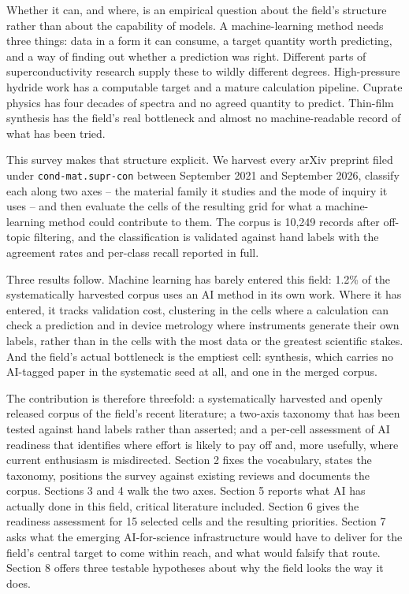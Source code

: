 \documentclass[
  11pt,
]{article}
\begin{document}
Whether it can, and where, is an empirical question about the field's
structure rather than about the capability of models. A machine-learning
method needs three things: data in a form it can consume, a target
quantity worth predicting, and a way of finding out whether a prediction
was right. Different parts of superconductivity research supply these to
wildly different degrees. High-pressure hydride work has a computable
target and a mature calculation pipeline. Cuprate physics has four
decades of spectra and no agreed quantity to predict. Thin-film
synthesis has the field's real bottleneck and almost no machine-readable
record of what has been tried.

This survey makes that structure explicit. We harvest every arXiv
preprint filed under \texttt{cond-mat.supr-con} between September 2021
and September 2026, classify each along two axes -- the material family
it studies and the mode of inquiry it uses -- and then evaluate the
cells of the resulting grid for what a machine-learning method could
contribute to them. The corpus is 10,249 records after off-topic
filtering, and the classification is validated against hand labels with
the agreement rates and per-class recall reported in full.

Three results follow. Machine learning has barely entered this field:
1.2\% of the systematically harvested corpus uses an AI method in its
own work. Where it has entered, it tracks validation cost, clustering in
the cells where a calculation can check a prediction and in device
metrology where instruments generate their own labels, rather than in
the cells with the most data or the greatest scientific stakes. And the
field's actual bottleneck is the emptiest cell: synthesis, which carries
no AI-tagged paper in the systematic seed at all, and one in the merged
corpus.

The contribution is therefore threefold: a systematically harvested and
openly released corpus of the field's recent literature; a two-axis
taxonomy that has been tested against hand labels rather than asserted;
and a per-cell assessment of AI readiness that identifies where effort
is likely to pay off and, more usefully, where current enthusiasm is
misdirected. Section 2 fixes the vocabulary, states the taxonomy,
positions the survey against existing reviews and documents the corpus.
Sections 3 and 4 walk the two axes. Section 5 reports what AI has
actually done in this field, critical literature included. Section 6
gives the readiness assessment for 15 selected cells and the resulting
priorities. Section 7 asks what the emerging AI-for-science
infrastructure would have to deliver for the field's central target to
come within reach, and what would falsify that route. Section 8 offers
three testable hypotheses about why the field looks the way it does.
\end{document}
